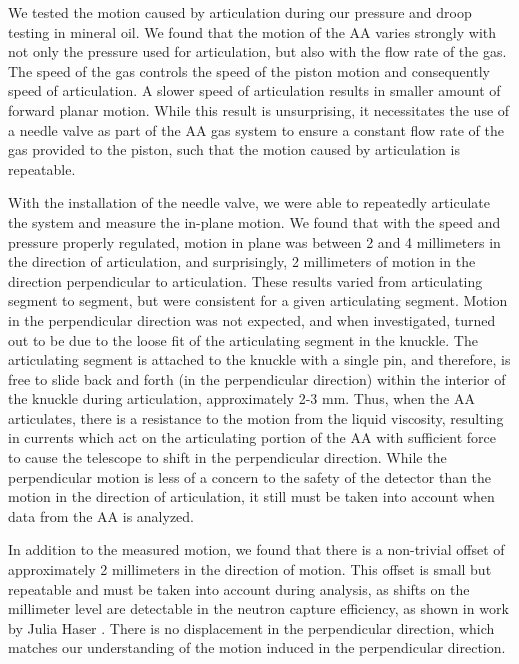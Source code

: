   We tested the motion caused by articulation during our pressure and droop testing in mineral oil. We found that the motion of the AA varies strongly with not only the pressure used for articulation, but also with the flow rate of the gas. The speed of the gas controls the speed of the piston motion and consequently speed of articulation. A slower speed of articulation results in smaller amount of forward planar motion. While this result is unsurprising, it necessitates the use of a needle valve as part of the AA gas system to ensure a constant flow rate of the gas provided to the piston, such that the motion caused by articulation is repeatable. 
  
  With the installation of the needle valve, we were able to repeatedly articulate the system and measure the in-plane motion. We found that with the speed and pressure properly regulated, motion in plane was between 2 and 4 millimeters in the direction of articulation, and surprisingly, 2 millimeters of motion in the direction perpendicular to articulation. These results varied from articulating segment to segment, but were consistent for a given articulating segment. Motion in the perpendicular direction was not expected, and when investigated, turned out to be due to the loose fit of the articulating segment in the knuckle. The articulating segment is attached to the knuckle with a single pin, and therefore, is free to slide back and forth (in the perpendicular direction) within the interior of the knuckle during articulation, approximately 2-3 mm. Thus, when the AA articulates, there is a resistance to the motion from the liquid viscosity, resulting in currents which act on the articulating portion of the AA with sufficient force to cause the telescope to shift in the perpendicular direction. While the perpendicular motion is less of a concern to the safety of the detector than the motion in the direction of articulation, it still must be taken into account when data from the AA is analyzed. 
  
  In addition to the measured motion, we found that there is a non-trivial offset of approximately 2 millimeters in the direction of motion. This offset is small but repeatable and must be taken into account during analysis, as shifts on the millimeter level are detectable in the neutron capture efficiency, as shown in work by Julia Haser \cite{Julia_Efficiency}. There is no displacement in the perpendicular direction, which matches our understanding of the motion induced in the perpendicular direction. 
  

